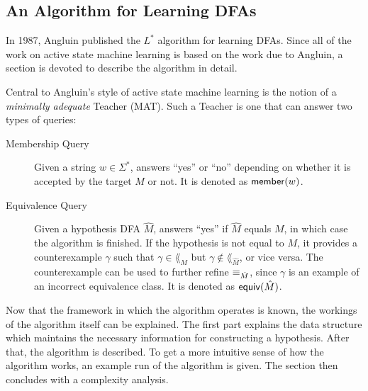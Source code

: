 \subsection{An Algorithm for Learning DFAs}
\label{sec:an-algor-learn}
In 1987, Angluin published the $L^*$ algorithm for learning
DFAs\cite{Angluin1987}. Since all of the work on active state machine learning is
based on the work due to Angluin, a section is devoted to describe the algorithm
in detail.

Central to Angluin's style of active state machine learning is the notion of a
\textit{minimally adequate} Teacher (MAT). Such a Teacher is one that can answer
two types of queries:

\begin{description}
\item[Membership Query] Given a string $w \in \Sigma^*$, answers ``yes'' or
  ``no'' depending on whether it is accepted by the target $M$ or not. It is
  denoted as $\mathsf{member}(w)$.
\item[Equivalence Query] Given a hypothesis DFA $\hat M$, answers ``yes'' if
  $\hat M$ equals $M$, in which case the algorithm is finished. If the
  hypothesis is not equal to $M$, it provides a counterexample $\gamma$ such
  that $\gamma \in \lang_M$ but $\gamma \not\in \lang_{\hat M}$, or vice
  versa. The counterexample can be used to further refine $\equiv_{\hat M}$,
  since $\gamma$ is an example of an incorrect equivalence class. It is denoted
  as $\mathsf{equiv}(\hat M)$.
\end{description}

Now that the framework in which the algorithm operates is known, the workings of
the algorithm itself can be explained. The first part explains the data
structure which maintains the necessary information for constructing a
hypothesis. After that, the algorithm is described. To get a more intuitive
sense of how the algorithm works, an example run of the algorithm is given. The
section then concludes with a complexity analysis.

